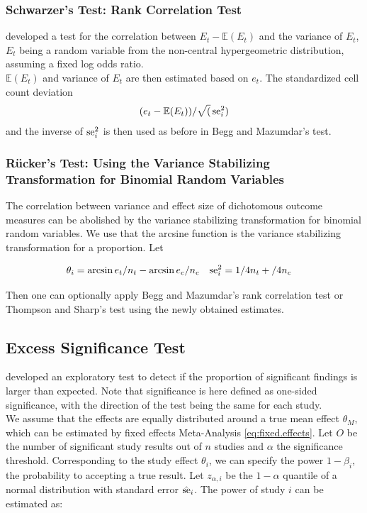 \documentclass[11pt,a4paper,twoside]{book}\usepackage[]{graphicx}\usepackage[]{color}
\begin{document}
\subsubsection{Schwarzer's Test: Rank Correlation Test} \label{sec:Schwarzer}
\citet{Schwarzer} developed a test for the correlation between $E_t - \mathbb{E}(E_t)$ and the variance of $E_t$, $E_t$ being a random variable from the non-central hypergeometric distribution, assuming a fixed log odds ratio. \\
$\mathbb{E}(E_t)$ and variance of $E_t$ are then estimated based on $e_t$. The standardized cell count deviation 
\begin{align}
(e_t - \mathbb{E}(E_t))/\sqrt(\operatorname{se}_i^2)
\end{align}
and the inverse of $\operatorname{se}_i^2$ is then used as before in Begg and Mazumdar's test.

\subsubsection{R\"ucker's Test: Using the Variance Stabilizing Transformation for Binomial Random Variables} \label{sec:Rucker}
The correlation between variance and effect size of dichotomous outcome measures can be abolished by the variance stabilizing transformation for binomial random variables. We use that the arcsine function is the variance stabilizing transformation for a proportion. Let

\begin{align}
\theta_i &= \arcsin{e_t/n_t} - \arcsin{e_c/n_c} \nonumber &
\operatorname{se}_i^2 &= 1/4n_t + /4n_c \nonumber
\end{align}

Then one can optionally apply Begg and Mazumdar's rank correlation test or Thompson and Sharp's test using the newly obtained estimates.


\subsection{Excess Significance Test} \label{sec:excess.significance}
\citet{excess.significance} developed an exploratory test to detect if the proportion of significant findings is larger than expected. Note that significance is here defined as one-sided significance, with the direction of the test being the same for each study. \\
We assume that the effects are equally distributed around a true mean effect $\theta_M$, which can be estimated by fixed effects Meta-Analysis \eqref{eq:fixed.effects}. Let $O$ be the number of significant study results out of $n$ studies and $\alpha$ the significance threshold. Corresponding to the study effect $\theta_i$, we can specify the power $1 - \beta_i$, the probability to accepting a true result. Let $z_{\alpha,i}$ be the $1-\alpha$ quantile of a normal distribution with standard error $\hat{\operatorname{se}}_i$. The power of study $i$ can be estimated as:
\end{document}
